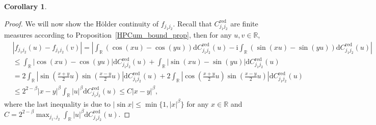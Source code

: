 \documentclass[11pt]{article}
\numberwithin{equation}{section}
\theoremstyle{plain}
\theoremstyle{definition}
\theoremstyle{definition}
\theoremstyle{assumption}
\theoremstyle{proposition}
\theoremstyle{proposition}
\newtheorem{corollary}{Corollary}[section]
\theoremstyle{example}
\theoremstyle{lemma}
\theoremstyle{theorem}
\theoremstyle{remark}
\begin{document}
\begin{corollary}
\begin{proof}
We will now show the H{\"o}lder continuity of $f_{j_1 j_2}$. Recall that $C_{j_1j_2}^{\mathrm{red}}$ are finite measures according to Proposition~\ref{HPCum_bound_prop}, then for any $u, v\in\mathbb{R}$,
\begin{align*}
&|f_{j_1 j_2}(u) - f_{j_1 j_2}(v)|
=\left|\int_{\mathbb{R}}(\cos(x u) - \cos(y u))\mathrm{d}C_{j_1j_2}^{\mathrm{red}}(u) - \mathrm{i}\int_{\mathbb{R}}(\sin(x u) - \sin(y u))\mathrm{d}C_{j_1j_2}^{\mathrm{red}}(u)\right| \\
&\leqslant \int_{\mathbb{R}}|\cos(x u) - \cos(y u)|\mathrm{d}C_{j_1j_2}^{\mathrm{red}}(u) + \int_{\mathbb{R}}|\sin(x u) - \sin(y u)|\mathrm{d}C_{j_1j_2}^{\mathrm{red}}(u) \\
&=2\int_{\mathbb{R}}\left|\sin\left(\frac{x+y}{2}u\right)\sin\left(\frac{x-y}{2}u\right)\right|\mathrm{d}C_{j_1j_2}^{\mathrm{red}}(u) + 2\int_{\mathbb{R}}\left|\cos\left(\frac{x+y}{2}u\right)\sin\left(\frac{x-y}{2}u\right)\right|\mathrm{d}C_{j_1j_2}^{\mathrm{red}}(u) \\
&\leqslant 2^{2-\beta} |x - y|^{\beta} \int_{\mathbb{R}}|u|^{\beta}\mathrm{d}C_{j_1j_2}^{\mathrm{red}}(u) 
\leqslant C |x - y|^{\beta},
\end{align*}
where the last inequality is due to $|\sin x|\leqslant\min\{1,|x|^{\beta}\}$ for any $x\in\mathbb{R}$ and $C=2^{2-\beta}\max_{j_1,j_2}\int_{\mathbb{R}}|u|^{\beta}\mathrm{d}C_{j_1j_2}^{\mathrm{red}}(u)$.
\end{proof}
\end{corollary}
\end{document}
